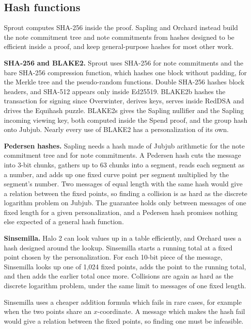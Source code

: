\documentclass{article}
\newcommand{\lsubsection}[2]{\def\sectionlabel{#2} \subsection{#1}\label{#2}}
\theoremstyle{labelledtheorem} %
\begin{document}
\lsubsection{Hash functions}{readablehashes}
\label{concretecrhivk}\label{sinsemillasecurity}%

Sprout computes SHA-256 inside the proof. Sapling and Orchard instead build the note commitment tree and note commitments from hashes designed to be efficient inside a proof, and keep general-purpose hashes for most other work.

\textbf{SHA-256 and BLAKE2.} Sprout uses SHA-256 for note commitments and the bare SHA-256 compression function, which hashes one block without padding, for the Merkle tree and the pseudo-random functions. Double SHA-256 hashes block headers, and SHA-512 appears only inside Ed25519. BLAKE2b hashes the transaction for signing since Overwinter, derives keys, serves inside RedDSA and drives the Equihash puzzle. BLAKE2s gives the Sapling nullifier and the Sapling incoming viewing key, both computed inside the Spend proof, and the group hash onto Jubjub. Nearly every use of BLAKE2 has a personalization of its own.

\textbf{Pedersen hashes.} Sapling needs a hash made of Jubjub arithmetic for the note commitment tree and for note commitments. A Pedersen hash cuts the message into 3-bit chunks, gathers up to 63 chunks into a segment, reads each segment as a number, and adds up one fixed curve point per segment multiplied by the segment's number. Two messages of equal length with the same hash would give a relation between the fixed points, so finding a collision is as hard as the discrete logarithm problem on Jubjub. The guarantee holds only between messages of one fixed length for a given personalization, and a Pedersen hash promises nothing else expected of a general hash function.

\textbf{Sinsemilla.} Halo 2 can look values up in a table efficiently, and Orchard uses a hash designed around the lookup. Sinsemilla starts a running total at a fixed point chosen by the personalization. For each 10-bit piece of the message, Sinsemilla looks up one of 1,024 fixed points, adds the point to the running total, and then adds the earlier total once more. Collisions are again as hard as the discrete logarithm problem, under the same limit to messages of one fixed length.

Sinsemilla uses a cheaper addition formula which fails in rare cases, for example when the two points share an $x$-coordinate. A message which makes the hash fail would give a relation between the fixed points, so finding one must be infeasible.
\end{document}

